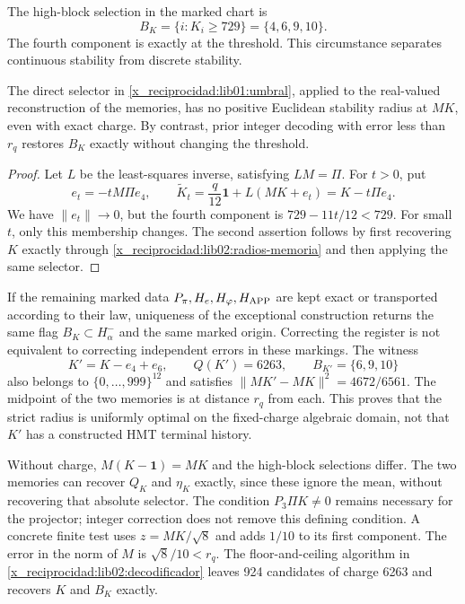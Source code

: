 The high-block selection in the marked chart is
\begin{equation}
 B_K=\{i:K_i\geq729\}=\{4,6,9,10\}.
 \label{x_reciprocidad:lib01:umbral}
\end{equation}
The fourth component is exactly at the threshold. This circumstance separates continuous stability from discrete stability.

\begin{proposition}
\label{x_reciprocidad:lib01:umbral-estable}
The direct selector in \eqref{x_reciprocidad:lib01:umbral}, applied to the real-valued reconstruction of the memories, has no positive Euclidean stability radius at \(MK\), even with exact charge. By contrast, prior integer decoding with error less than \(r_q\) restores \(B_K\) exactly without changing the threshold.
\end{proposition}
\begin{proof}
Let \(L\) be the least-squares inverse, satisfying \(LM=\Pi\). For \(t>0\), put
\[
 e_t=-tM\Pi e_4,
 \qquad \widetilde K_t=\frac q{12}\mathbf1+L(MK+e_t)
 =K-t\Pi e_4.
\]
We have \(\|e_t\|\to0\), but the fourth component is \(729-11t/12<729\). For small \(t\), only this membership changes. The second assertion follows by first recovering \(K\) exactly through \cref{x_reciprocidad:lib02:radios-memoria} and then applying the same selector.
\end{proof}

If the remaining marked data \(P_\pi,H_e,H_\varphi,H_{\rm APP}\) are kept exact or transported according to their law, uniqueness of the exceptional construction returns the same flag \(B_K\subset H^-_\alpha\) and the same marked origin. Correcting the register is not equivalent to correcting independent errors in these markings. The witness
\[
 K'=K-e_4+e_6,
 \qquad Q(K')=6263,\qquad B_{K'}=\{6,9,10\}
\]
also belongs to \(\{0,\ldots,999\}^{12}\) and satisfies \(\|MK'-MK\|^2=4672/6561\). The midpoint of the two memories is at distance \(r_q\) from each. This proves that the strict radius is uniformly optimal on the fixed-charge algebraic domain, not that \(K'\) has a constructed HMT terminal history.

Without charge, \(M(K-\mathbf1)=MK\) and the high-block selections differ. The two memories can recover \(Q_K\) and \(\eta_K\) exactly, since these ignore the mean, without recovering that absolute selector. The condition \(P_3\Pi K\ne0\) remains necessary for the projector; integer correction does not remove this defining condition. A concrete finite test uses \(z=MK/\sqrt8\) and adds \(1/10\) to its first component. The error in the norm of \(M\) is \(\sqrt8/10<r_q\). The floor-and-ceiling algorithm in \cref{x_reciprocidad:lib02:decodificador} leaves 924 candidates of charge 6263 and recovers \(K\) and \(B_K\) exactly.

